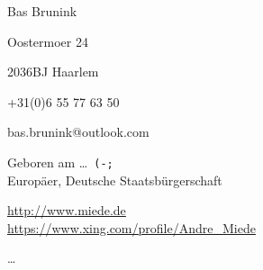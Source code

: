 \documentclass[10pt,a4paper]{scrartcl}
\begin{document}
    \pagestyle{plain}
    \begin{cv}{}
        \begin{cvlist}{}\label{PersDat}  %
            \item Bas Brunink
            \item Oostermoer 24
            \item 2036BJ Haarlem
            \item +31(0)6 55 77 63 50
            \item bas.brunink@outlook.com
            \item   Geboren am \dots\ \texttt{(-;} \\   
                    Europ\"aer, Deutsche Staatsb\"urgerschaft 
            \item   \url{http://www.miede.de} \\                
                    \url{https://www.xing.com/profile/Andre_Miede}              
        \end{cvlist}
        
        \clearpage
        \begin{cvlist}{}\label{irgendwas}
            \item   \dots 
        \end{cvlist}
    \end{cv}
\end{document}
